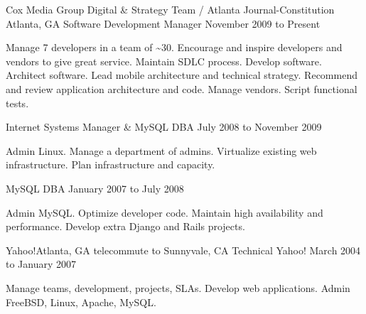 \documentclass[10pt]{article}
\begin{document}




\sectionheader
{Cox Media Group Digital \& Strategy Team / Atlanta Journal-Constitution}
{Atlanta, GA}
{Software Development Manager}
{November 2009 to Present}
\begin{longtext}
Manage 7 developers in a team of \~{}30.
Encourage and inspire developers and vendors to give great service.
Maintain SDLC process.
Develop software.
Architect software.
Lead mobile architecture and technical strategy.
Recommend and review application architecture and code.
Manage vendors.
Script functional tests.

\end{longtext}
\sectionsub
{Internet Systems Manager \& MySQL DBA}
{July 2008 to November 2009}
\begin{longtext}
Admin Linux.
Manage a department of admins.
Virtualize existing web infrastructure.
Plan infrastructure and capacity.
\end{longtext}
\sectionsub
{MySQL DBA}
{January 2007 to July 2008}
\begin{longtext}
Admin MySQL.
Optimize developer code.
Maintain high availability and performance.
Develop extra Django and Rails projects.
\end{longtext}

\sectionheader
{Yahoo!}{Atlanta, GA telecommute to Sunnyvale, CA}
{Technical Yahoo!}
{March 2004 to January 2007}
\begin{longtext}
Manage teams, development, projects, SLAs.
Develop web applications.
Admin FreeBSD, Linux, Apache, MySQL.
\end{longtext}
\end{document}
